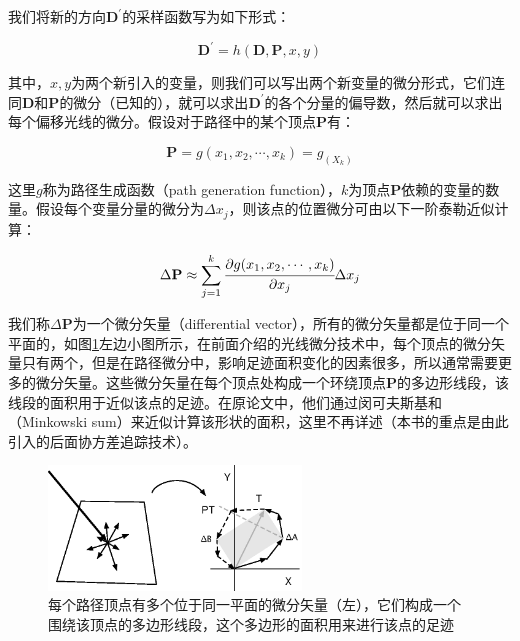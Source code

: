 我们将新的方向$\mathbf{D}^{'}$的采样函数写为如下形式：

\begin{equation}
	\mathbf{D}^{'}=h(\mathbf{D},\mathbf{P},x,y)
\end{equation}

\noindent 其中，$x,y$为两个新引入的变量，则我们可以写出两个新变量的微分形式，它们连同$\mathbf{D}$和$\mathbf{P}$的微分（已知的），就可以求出$\mathbf{D}^{'}$的各个分量的偏导数，然后就可以求出每个偏移光线的微分。假设对于路径中的某个顶点$\mathbf{P}$有：

\begin{equation}
	\mathbf{P}=g(x_1,x_2,\cdots, x_k)=g_(X_k)
\end{equation}

\noindent 这里$g$称为路径生成函数（path generation function），$k$为顶点$\mathbf{P}$依赖的变量的数量。假设每个变量分量的微分为$\Delta x_j$，则该点的位置微分可由以下一阶泰勒近似计算：

\begin{equation}\label{e:pt-differential-vector}
	\Delta\mathbf{P}\approx\sum^{k}_{j=1}  \cfrac{{\rm \partial} g(x_1,x_2,\cdots, x_k)}{{\rm \partial} x_j}\Delta x_j
\end{equation}

\noindent 我们称$\Delta\mathbf{P}$为一个微分矢量（differential vector），所有的微分矢量都是位于同一个平面的，如图\ref{f:pt-differential-vectors}左边小图所示，在前面介绍的光线微分技术中，每个顶点的微分矢量只有两个，但是在路径微分中，影响足迹面积变化的因素很多，所以通常需要更多的微分矢量。这些微分矢量在每个顶点处构成一个环绕顶点$\mathbf{P}$的多边形线段，该线段的面积用于近似该点的足迹。在原论文\cite{a:Pathdifferentialsandapplications}中，他们通过闵可夫斯基和（Minkowski sum）来近似计算该形状的面积，这里不再详述（本书的重点是由此引入的后面协方差追踪技术）。

\begin{figure}
	\sidecaption
	\includegraphics[width=0.6\textwidth]{figures/pt/differential-vectors}
	\caption{每个路径顶点有多个位于同一平面的微分矢量（左），它们构成一个围绕该顶点的多边形线段，这个多边形的面积用来进行该点的足迹}
	\label{f:pt-differential-vectors}
\end{figure}

